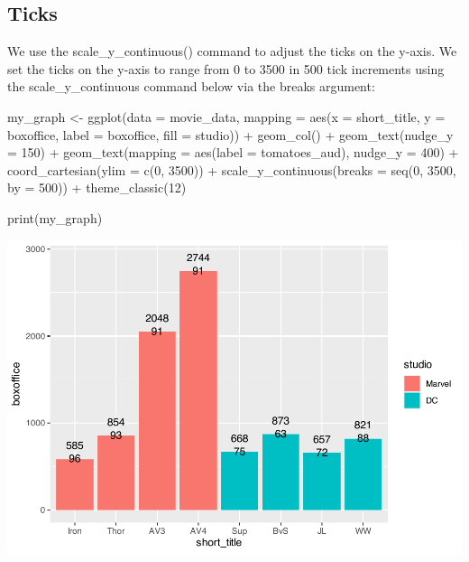 \documentclass[
]{krantz}
\makeatletter
\newenvironment{Shaded}{\begin{snugshade}}{\end{snugshade}}
\newcommand{\AttributeTok}[1]{\textcolor[rgb]{0.61,0.61,0.61}{#1}}
\newcommand{\DecValTok}[1]{\textcolor[rgb]{0.06,0.06,0.06}{#1}}
\newcommand{\FunctionTok}[1]{\textcolor[rgb]{0,0,0}{#1}}
\newcommand{\NormalTok}[1]{#1}
\newcommand{\OtherTok}[1]{\textcolor[rgb]{0.37,0.37,0.37}{#1}}
\newcommand{\SpecialCharTok}[1]{\textcolor[rgb]{0,0,0}{#1}}
\newenvironment{kframe}{%
\medskip{}
\setlength{\fboxsep}{.8em}
 \def\at@end@of@kframe{}%
 \ifinner\ifhmode%
  \def\at@end@of@kframe{\end{minipage}}%
  \begin{minipage}{\columnwidth}%
 \fi\fi%
 \def\FrameCommand##1{\hskip\@totalleftmargin \hskip-\fboxsep
 \colorbox{shadecolor}{##1}\hskip-\fboxsep
     \hskip-\linewidth \hskip-\@totalleftmargin \hskip\columnwidth}%
 \MakeFramed {\advance\hsize-\width
   \@totalleftmargin\z@ \linewidth\hsize
   \@setminipage}}%
 {\par\unskip\endMakeFramed%
 \at@end@of@kframe}
\renewenvironment{Shaded}{\begin{kframe}}{\end{kframe}}
\makeatother
\begin{document}
\hypertarget{ticks}{%
\subsection{Ticks}\label{ticks}}

We use the scale\_y\_continuous() command to adjust the ticks on the y-axis. We set the ticks on the y-axis to range from 0 to 3500 in 500 tick increments using the scale\_y\_continuous command below via the breaks argument:

\begin{Shaded}
\begin{Highlighting}[]
\NormalTok{my\_graph }\OtherTok{\textless{}{-}} \FunctionTok{ggplot}\NormalTok{(}\AttributeTok{data =}\NormalTok{ movie\_data,}
           \AttributeTok{mapping =} \FunctionTok{aes}\NormalTok{(}\AttributeTok{x =}\NormalTok{ short\_title,}
                         \AttributeTok{y =}\NormalTok{ boxoffice,}
                         \AttributeTok{label =}\NormalTok{ boxoffice, }
                         \AttributeTok{fill =}\NormalTok{ studio)) }\SpecialCharTok{+}
  \FunctionTok{geom\_col}\NormalTok{() }\SpecialCharTok{+}
  \FunctionTok{geom\_text}\NormalTok{(}\AttributeTok{nudge\_y =} \DecValTok{150}\NormalTok{)  }\SpecialCharTok{+}
  \FunctionTok{geom\_text}\NormalTok{(}\AttributeTok{mapping =} \FunctionTok{aes}\NormalTok{(}\AttributeTok{label =}\NormalTok{ tomatoes\_aud), }
            \AttributeTok{nudge\_y =} \DecValTok{400}\NormalTok{) }\SpecialCharTok{+}
  \FunctionTok{coord\_cartesian}\NormalTok{(}\AttributeTok{ylim =} \FunctionTok{c}\NormalTok{(}\DecValTok{0}\NormalTok{, }\DecValTok{3500}\NormalTok{)) }\SpecialCharTok{+}
  \FunctionTok{scale\_y\_continuous}\NormalTok{(}\AttributeTok{breaks =} \FunctionTok{seq}\NormalTok{(}\DecValTok{0}\NormalTok{, }\DecValTok{3500}\NormalTok{, }\AttributeTok{by =} \DecValTok{500}\NormalTok{)) }\SpecialCharTok{+}
  \FunctionTok{theme\_classic}\NormalTok{(}\DecValTok{12}\NormalTok{)}

\FunctionTok{print}\NormalTok{(my\_graph)}
\end{Highlighting}
\end{Shaded}

\includegraphics[width=0.65\linewidth]{bookdown_files/figure-latex/unnamed-chunk-119-1}
\end{document}
